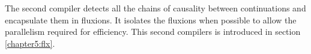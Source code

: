 The second compiler detects all the chains of causality between continuations and encapsulate them in fluxions.
It isolates the fluxions when possible to allow the parallelism required for efficiency.
This second compilers is introduced in section \ref{chapter5:flx}.




